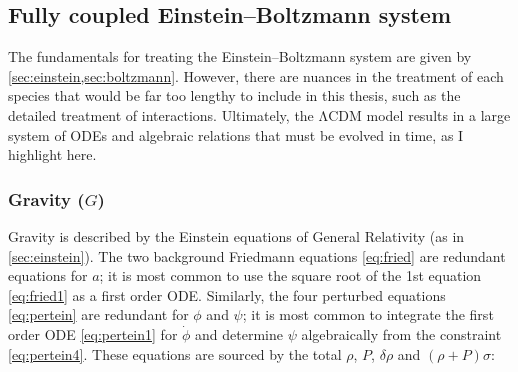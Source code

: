 \documentclass[USenglish, thumbmarks]{uiophdthesis} %
\newcommand\LCDM{\ensuremath{\mathrm{\Lambda CDM}}}
\newcommand\EB{Einstein--Boltzmann}
\begin{document}
\subsection{Fully coupled \EB{} system}
\label{sec:eb_full}

The fundamentals for treating the \EB{} system are given by \cref{sec:einstein,sec:boltzmann}.
However, there are nuances in the treatment of each species that would be far too lengthy to include in this thesis,
such as the detailed treatment of interactions.
Ultimately, the \LCDM{} model results in a large system of ODEs and algebraic relations that must be evolved in time,
as I highlight here.

\subsubsection{Gravity (\texorpdfstring{$G$}{G})}
Gravity is described by the Einstein equations of General Relativity (as in \cref{sec:einstein}).
The two background Friedmann equations \eqref{eq:fried} are redundant equations for $a$;
it is most common to use the square root of the 1st equation \eqref{eq:fried1} as a first order ODE.
Similarly, the four perturbed equations \eqref{eq:pertein} are redundant for $\phi$ and $\psi$;
it is most common to integrate the first order ODE \eqref{eq:pertein1} for $\dot{\phi}$
and determine $\psi$ algebraically from the constraint \eqref{eq:pertein4}.
These equations are sourced by the total $\rho$, $P$, $\delta\rho$ and $(\rho+P)\sigma$:
\end{document}

